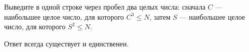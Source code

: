Выведите в одной строке через пробел два целых числа: сначала $C$ --- наибольшее целое число, для которого $C^3 \le N$, затем $S$ --- наибольшее целое число, для которого $S^2 \le N$.

Ответ всегда существует и единственен.
